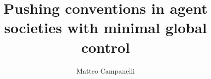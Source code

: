 \documentclass{article}
\title{Pushing conventions in agent societies with minimal global control}
\author{Matteo Campanelli}
\begin{document}
\maketitle
\tableofcontents



\verbatimfont{\itshape\ttfamily}







\end{document}
